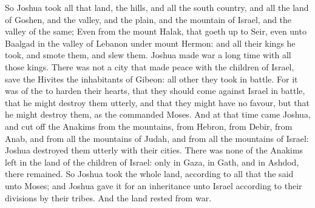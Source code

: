 \begin{biblechapter}
\verse So Joshua took all that land, the hills, and all the south country, and all the land of Goshen, and the valley, and the plain, and the mountain of Israel, and the valley of the same;
\verse Even from the mount Halak, that goeth up to Seir, even unto Baalgad in the valley of Lebanon under mount Hermon: and all their kings he took, and smote them, and slew them.
\verse Joshua made war a long time with all those kings.
\verse There was not a city that made peace with the children of Israel, save the Hivites the inhabitants of Gibeon: all other they took in battle.
\verse For it was of the \LORD to harden their hearts, that they should come against Israel in battle, that he might destroy them utterly, and that they might have no favour, but that he might destroy them, as the \LORD commanded Moses.
\verse And at that time came Joshua, and cut off the Anakims from the mountains, from Hebron, from Debir, from Anab, and from all the mountains of Judah, and from all the mountains of Israel: Joshua destroyed them utterly with their cities.
\verse There was none of the Anakims left in the land of the children of Israel: only in Gaza, in Gath, and in Ashdod, there remained.
\verse So Joshua took the whole land, according to all that the \LORD said unto Moses; and Joshua gave it for an inheritance unto Israel according to their divisions by their tribes. And the land rested from war.
\end{biblechapter}

